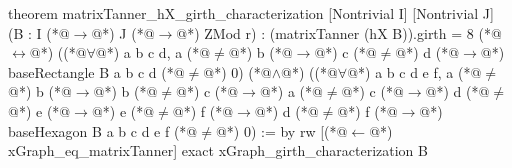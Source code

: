 theorem matrixTanner_hX_girth_characterization [Nontrivial I] [Nontrivial J]
    (B : I (*@$\to$@*) J (*@$\to$@*) ZMod r) :
    (matrixTanner (hX B)).girth = 8 (*@$\leftrightarrow$@*)
      ((*@$\forall$@*) a b c d, a (*@$\ne$@*) b (*@$\to$@*) c (*@$\ne$@*) d (*@$\to$@*) baseRectangle B a b c d (*@$\ne$@*) 0) (*@$\land$@*)
      ((*@$\forall$@*) a b c d e f, a (*@$\ne$@*) b (*@$\to$@*) b (*@$\ne$@*) c (*@$\to$@*) a (*@$\ne$@*) c (*@$\to$@*) d (*@$\ne$@*) e (*@$\to$@*) e (*@$\ne$@*) f (*@$\to$@*) d (*@$\ne$@*) f (*@$\to$@*)
        baseHexagon B a b c d e f (*@$\ne$@*) 0) := by
  rw [(*@$\leftarrow$@*) xGraph_eq_matrixTanner]
  exact xGraph_girth_characterization B
